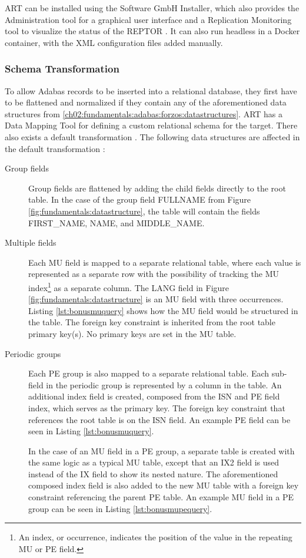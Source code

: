 \ac{ART} can be installed using the Software GmbH Installer, which also provides the Administration tool for a graphical user interface and a Replication Monitoring tool to visualize the status of the \ac{REPTOR} \cite{artconcepts}. It can also run headless in a Docker container, with the XML configuration files added manually.

\subsubsection{Schema Transformation}
\label{ch02:fundamentals:adabas:art:schematransformation}
To allow Adabas records to be inserted into a relational database, they first have to be flattened and normalized if they contain any of the aforementioned data structures from \ref{ch02:fundamentals:adabas:forzos:datastructures}. \ac{ART} has a Data Mapping Tool for defining a custom relational schema for the target. There also exists a default transformation \cite{artconcepts}. The following data structures are affected in the default transformation \cite{artconcepts}:
\begin{description}
\item [Group fields]
Group fields are flattened by adding the child fields directly to the root table. In the case of the group field FULLNAME from Figure \ref{fig:fundamentals:datastructure}, the table will contain the fields FIRST\_NAME, NAME, and MIDDLE\_NAME.
\item [Multiple fields]
Each MU field is mapped to a separate relational table, where each value is represented as a separate row with the possibility of tracking the MU index\footnote{An index, or occurrence, indicates the position of the value in the repeating MU or PE field.} as a separate column. The LANG field in Figure \ref{fig:fundamentals:datastructure} is an MU field with three occurrences. Listing \ref{lst:bonusmuquery}  shows how the MU field would be structured in the table. The foreign key constraint is inherited from the root table primary key(s). No primary keys are set in the MU table.
\item[Periodic groups]
Each PE group is also mapped to a separate relational table. Each sub-field in the periodic group is represented by a column in the table. An additional index field is created, composed from the \ac{ISN} and PE field index, which serves as the primary key. The foreign key constraint that references the root table is on the \ac{ISN} field. An example PE field can be seen in Listing \ref{lst:bonusmuquery}.

In the case of an MU field in a PE group, a separate table is created with the same logic as a typical MU table, except that an IX2 field is used instead of the IX field to show its nested nature. The aforementioned composed index field is also added to the new MU table with a foreign key constraint referencing the parent PE table. An example MU field in a PE group can be seen in Listing \ref{lst:bonusmupequery}.

\end{description}

